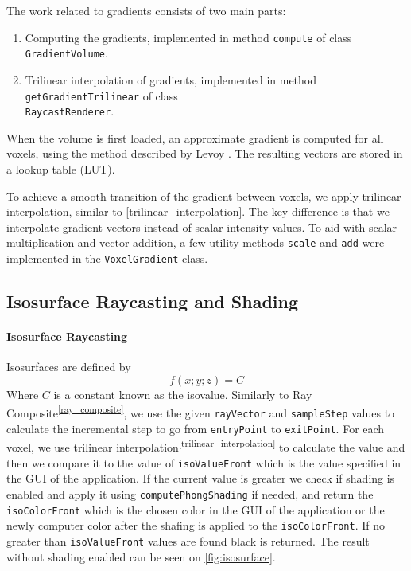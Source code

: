 \documentclass[a4paper]{article}
\begin{document}
The work related to gradients consists of two main parts:

\begin{enumerate}
  \item Computing the gradients, implemented in method {\tt compute} of class {\tt GradientVolume}.
  \item Trilinear interpolation of gradients, implemented in method {\tt getGradientTrilinear} of class\\ {\tt RaycastRenderer}.
\end{enumerate}

\noindent When the volume is first loaded, an approximate gradient is computed for all voxels, using the method described by Levoy \citep{levoy_1988}. The resulting vectors are stored in a lookup table (LUT).

To achieve a smooth transition of the gradient between voxels, we apply trilinear interpolation, similar to \autoref{trilinear_interpolation}. The key difference is that we interpolate gradient vectors instead of scalar intensity values. To aid with scalar multiplication and vector addition, a few utility methods {\tt scale} and {\tt add} were implemented in the {\tt VoxelGradient} class.

\subsection{Isosurface Raycasting and Shading}

\paragraph{Isosurface Raycasting}
\label{isosurface}

Isosurfaces are defined by
 $$f(x; y; z) = C$$ 
Where $C$ is a constant known as the isovalue. Similarly to Ray Composite\textsuperscript{\autoref{ray_composite}}, we use the given {\tt rayVector} and {\tt sampleStep} values to calculate the incremental step to go from {\tt entryPoint} to {\tt exitPoint}. For each voxel, we use trilinear interpolation\textsuperscript{\autoref{trilinear_interpolation}} to calculate the value and then we compare it to the value of {\tt isoValueFront} which is the value specified in the GUI of the application. If the current value is greater we check if shading is enabled and apply it using {\tt computePhongShading} if needed, and return the {\tt isoColorFront} which is the chosen color in the GUI of the application or the newly computer color after the shafing is applied to the  {\tt isoColorFront}. If no greater than {\tt isoValueFront} values are found black is returned. The result without shading enabled can be seen on \autoref{fig:isosurface}.
\end{document}
